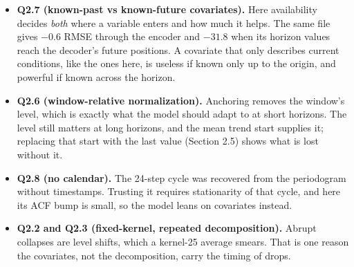 \begin{itemize}
  \item \textbf{Q2.7 (known-past vs known-future covariates).} Here availability decides \emph{both} where a variable enters and how much it helps. The same file gives $-0.6$ RMSE through the encoder and $-31.8$ when its horizon values reach the decoder's future positions. A covariate that only describes current conditions, like the ones here, is useless if known only up to the origin, and powerful if known across the horizon.
  \item \textbf{Q2.6 (window-relative normalization).} Anchoring removes the window's level, which is exactly what the model should adapt to at short horizons. The level still matters at long horizons, and the mean trend start supplies it; replacing that start with the last value (Section 2.5) shows what is lost without it.
  \item \textbf{Q2.8 (no calendar).} The 24-step cycle was recovered from the periodogram without timestamps. Trusting it requires stationarity of that cycle, and here its ACF bump is small, so the model leans on covariates instead.
  \item \textbf{Q2.2 and Q2.3 (fixed-kernel, repeated decomposition).} Abrupt collapses are level shifts, which a kernel-25 average smears. That is one reason the covariates, not the decomposition, carry the timing of drops.
\end{itemize}
